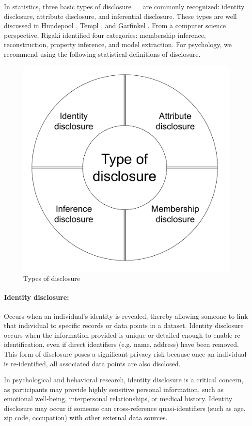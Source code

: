 \documentclass{article}
\begin{document}

In statistics, three basic types of disclosure \cite{1993_Lambert}~\cite{1989_Duncan}~\cite{1977_Dalenius} are commonly recognized: identity disclosure, attribute disclosure, and inferential disclosure. These types are well discussed in Hundepool \cite{2012_Hundepool}, Templ \cite{2017_Templ}, and Garfinkel \cite{2023_NIST}. From a computer science perspective, Rigaki \cite{2024_Rigaki} identified four categories: membership inference, reconstruction, property inference, and model extraction. For psychology, we recommend using the following statistical definitions of disclosure.

\begin{figure}[H]
    \centering
    \includegraphics[width=0.5\linewidth]{Drawio/Type_of_disclosure.drawio.pdf}
    \caption{Types of disclosure}
    \label{fig:enter-label}
\end{figure}

\paragraph{Identity disclosure:} 
Occurs when an individual’s identity is revealed, thereby allowing someone to link that individual to specific records or data points in a dataset. Identity disclosure occurs when the information provided is unique or detailed enough to enable re-identification, even if direct identifiers (e.g. name, address) have been removed. This form of disclosure poses a significant privacy risk because once an individual is re-identified, all associated data points are also disclosed.

In psychological and behavioral research, identity disclosure is a critical concern, as participants may provide highly sensitive personal information, such as emotional well-being, interpersonal relationships, or medical history. Identity disclosure may occur if someone can cross-reference quasi-identifiers (such as age, zip code, occupation) with other external data sources.
\end{document}
